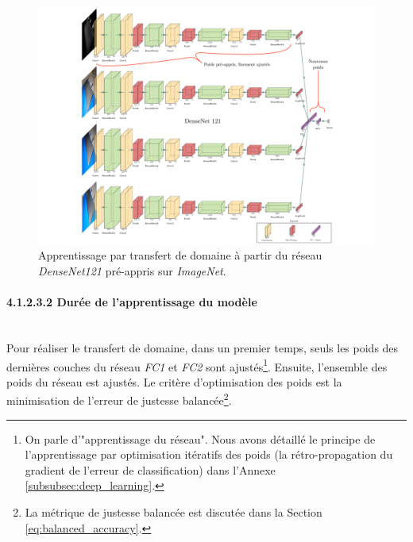 \begin{figure}
	\centering
	\includegraphics[width=\textwidth,height=\textheight,keepaspectratio]{../Chap5/Figures/transfer_densenet121.pdf}
	\caption{Apprentissage par transfert de domaine à partir du réseau \textit{DenseNet121} pré-appris sur \textit{ImageNet}.}
	\label{fig:transferdensenet121}
\end{figure}


\paragraph{4.1.2.3.2 Durée de l'apprentissage du modèle} \mbox{} \\
Pour réaliser le transfert de domaine, dans un premier temps, seuls les poids des dernières couches du réseau \textit{FC1} et \textit{FC2} sont ajustés\footnote{On parle d'"apprentissage du réseau". Nous avons détaillé le principe de l'apprentissage par optimisation itératifs des poids (la rétro-propagation du gradient de l'erreur de classification) dans l'Annexe \ref{subsubsec:deep_learning}.}.
Ensuite, l'ensemble des poids du réseau est ajustés.
Le critère d'optimisation des poids est la minimisation de l'erreur de justesse balancée\footnote{La métrique de justesse balancée est discutée dans la Section \ref{eq:balanced_accuracy}.}.

